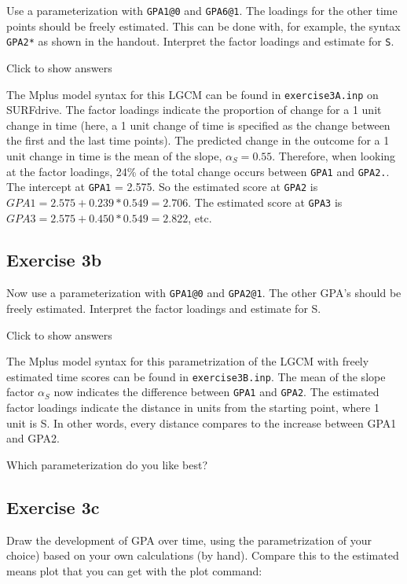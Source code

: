 \documentclass[
]{book}
\begin{document}
Use a parameterization with \texttt{GPA1@0} and \texttt{GPA6@1}. The loadings for the other time points should be freely estimated. This can be done with, for example, the syntax \texttt{GPA2*} as shown in the handout. Interpret the factor loadings and estimate for \texttt{S}.

Click to show answers

The Mplus model syntax for this LGCM can be found in \texttt{exercise3A.inp} on SURFdrive. The factor loadings indicate the proportion of change for a 1 unit change in time (here, a 1 unit change of time is specified as the change between the first and the last time points). The predicted change in the outcome for a 1 unit change in time is the mean of the slope, \(\alpha_{S} = 0.55\). Therefore, when looking at the factor loadings, 24\% of the total change occurs between \texttt{GPA1} and \texttt{GPA2.}. The intercept at \texttt{GPA1} = 2.575. So the estimated score at \texttt{GPA2} is \(GPA1 = 2.575 + 0.239*0.549 = 2.706\). The estimated score at \texttt{GPA3} is \(GPA3 = 2.575 + 0.450*0.549 = 2.822\), etc.

\hypertarget{exercise-3b}{%
\subsection{Exercise 3b}\label{exercise-3b}}

Now use a parameterization with \texttt{GPA1@0} and \texttt{GPA2@1}. The other GPA's should be freely estimated. Interpret the factor loadings and estimate for S.

Click to show answers

The Mplus model syntax for this parametrization of the LGCM with freely estimated time scores can be found in \texttt{exercise3B.inp}. The mean of the slope factor \(\alpha_{S}\) now indicates the difference between \texttt{GPA1} and \texttt{GPA2}. The estimated factor loadings indicate the distance in units from the starting point, where 1 unit is S. In other words, every distance compares to the increase between GPA1 and GPA2.

Which parameterization do you like best?

\hypertarget{exercise-3c}{%
\subsection{Exercise 3c}\label{exercise-3c}}

Draw the development of GPA over time, using the parametrization of your choice) based on your own calculations (by hand). Compare this to the estimated means plot that you can get with the plot command:
\end{document}
